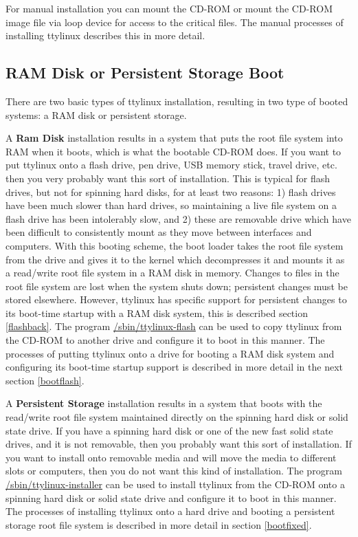 \documentclass[10pt]{article}
\begin{document}
For manual installation you can mount the CD-ROM or mount the CD-ROM image file
via loop device for access to the critical files. The manual processes of
installing ttylinux describes this in more detail.

\subsection{RAM Disk or Persistent Storage Boot}

There are two basic types of ttylinux installation, resulting in two type of
booted systems: a RAM disk or persistent storage.

A {\bf Ram Disk} installation results in a system that puts the root file
system into RAM when it boots, which is what the bootable CD-ROM does. If you
want to put ttylinux onto a flash drive, pen drive, USB memory stick, travel
drive, etc. then you very probably want this sort of installation. This is
typical for flash drives, but not for spinning hard disks, for at least two
reasons: 1) flash drives have been much slower than hard drives, so maintaining
a live file system on a flash drive has been intolerably slow, and 2) these are
removable drive which have been difficult to consistently mount as they move
between interfaces and computers. With this booting scheme, the boot loader
takes the root file system from the drive and gives it to the kernel which
decompresses it and mounts it as a read/write root file system in a RAM disk in
memory. Changes to files in the root file system are lost when the system shuts
down; persistent changes must be stored elsewhere. However, ttylinux has
specific support for persistent changes to its boot-time startup with a RAM
disk system, this is described section \ref{flashback}. The program
\url{/sbin/ttylinux-flash} can be used to copy ttylinux from the CD-ROM to
another drive and configure it to boot in this manner. The processes of putting
ttylinux onto a drive for booting a RAM disk system and configuring its
boot-time startup support is described in more detail in the next section
\ref{bootflash}.

A {\bf Persistent Storage} installation results in a system that boots with the
read/write root file system maintained directly on the spinning hard disk or
solid state drive. If you have a spinning hard disk or one of the new fast
solid state drives, and it is not removable, then you probably want this sort
of installation. If you want to install onto removable media and will move the
media to different slots or computers, then you do not want this kind of
installation. The program \url{/sbin/ttylinux-installer} can be used to install
ttylinux from the CD-ROM onto a spinning hard disk or solid state drive and
configure it to boot in this manner. The processes of installing ttylinux onto
a hard drive and booting a persistent storage root file system is described in
more detail in section \ref{bootfixed}.
\end{document}
